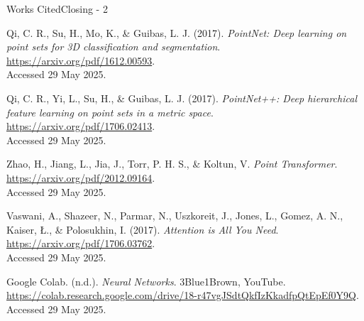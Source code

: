\documentclass{beamer}
\begin{document}
		\begin{frame}[allowframebreaks]{Works Cited}{Closing - 2}
			\begin{thebibliography}{}\small
				Qi, C. R., Su, H., Mo, K., \& Guibas, L. J. (2017). \textit{PointNet: Deep learning on point sets for 3D classification and segmentation}.\\
				\url{https://arxiv.org/pdf/1612.00593}.\\
				Accessed 29 May 2025.
				
				Qi, C. R., Yi, L., Su, H., \& Guibas, L. J. (2017). \textit{PointNet++: Deep hierarchical feature learning on point sets in a metric space}.\\
				\url{https://arxiv.org/pdf/1706.02413}.\\
				Accessed 29 May 2025.
				
				Zhao, H., Jiang, L., Jia, J., Torr, P. H. S., \& Koltun, V. \textit{Point Transformer}.\\
				\url{https://arxiv.org/pdf/2012.09164}.\\
				Accessed 29 May 2025.
				
				Vaswani, A., Shazeer, N., Parmar, N., Uszkoreit, J., Jones, L., Gomez, A. N., Kaiser, Ł., \& Polosukhin, I. (2017).
				\textit{Attention is All You Need}.\\
				\url{https://arxiv.org/pdf/1706.03762}.\\
				Accessed 29 May 2025.
				
				Google Colab. (n.d.). \textit{Neural Networks}. 3Blue1Brown, YouTube.\\
				\url{https://colab.research.google.com/drive/18-r47vgJSdtQkfIzKkadfpQtEpEf0Y9Q}.\\
				Accessed 29 May 2025.
				
			\end{thebibliography}
		\end{frame}
\end{document}
